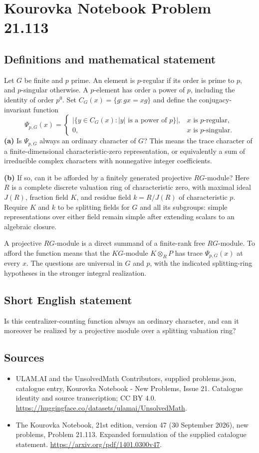\documentclass[11pt,a4paper]{article}
\begin{document}
\section*{Kourovka Notebook Problem 21.113}\label{statement}

\subsection{Definitions and mathematical statement}
Let $G$ be finite and $p$ prime. An element is $p$-regular if its order is prime to $p$, and $p$-singular otherwise. A $p$-element has order a power of $p$, including the identity of order $p^0$. Set $C_G(x)=\{g:gx=xg\}$ and define the conjugacy-invariant function
\[
 \Psi_{p,G}(x)=
 \begin{cases}
 |\{y\in C_G(x):|y|\text{ is a power of }p\}|,
       &x\text{ is }p\text{-regular},\\
 0,&x\text{ is }p\text{-singular}.
 \end{cases}
\]
\textbf{(a)} Is $\Psi_{p,G}$ always an ordinary character of $G$? This means the trace character of a finite-dimensional characteristic-zero representation, or equivalently a sum of irreducible complex characters with nonnegative integer coefficients.

\textbf{(b)} If so, can it be afforded by a finitely generated projective $RG$-module? Here $R$ is a complete discrete valuation ring of characteristic zero, with maximal ideal $J(R)$, fraction field $K$, and residue field $k=R/J(R)$ of characteristic $p$. Require $K$ and $k$ to be splitting fields for $G$ and all its subgroups: simple representations over either field remain simple after extending scalars to an algebraic closure.

A projective $RG$-module is a direct summand of a finite-rank free $RG$-module. To afford the function means that the $KG$-module $K\otimes_R P$ has trace $\Psi_{p,G}(x)$ at every $x$. The questions are universal in $G$ and $p$, with the indicated splitting-ring hypotheses in the stronger integral realization.
\subsection{Short English statement}
Is this centralizer-counting function always an ordinary character, and can it moreover be realized by a projective module over a splitting valuation ring?
\subsection{Sources}
\begin{itemize}
\item[S1] ULAM.AI and the UnsolvedMath Contributors, supplied problems.json, catalogue entry, Kourovka Notebook - New Problems, Issue 21. Catalogue identity and source transcription; CC BY 4.0.
\url{https://huggingface.co/datasets/ulamai/UnsolvedMath}.
\item[S2] The Kourovka Notebook, 21st edition, version 47 (30 September 2026), new problems, Problem 21.113. Expanded formulation of the supplied catalogue statement.
\url{https://arxiv.org/pdf/1401.0300v47}.
\end{itemize}
\end{document}
